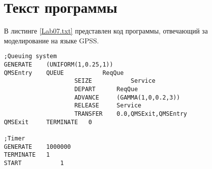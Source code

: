 \chapter{Текст программы}
В листинге \ref{Lab07.txt} представлен код программы, отвечающий за моделирование на языке GPSS.

\begin{lstlisting}[caption = {Реализация модели}, label=Lab07.txt]
;Queuing system
GENERATE	(UNIFORM(1,0.25,1))
QMSEntry	QUEUE			ReqQue
					SEIZE			Service
					DEPART		ReqQue
					ADVANCE		(GAMMA(1,0,0.2,3))
					RELEASE		Service
					TRANSFER	0.0,QMSExit,QMSEntry
QMSExit		TERMINATE	0

;Timer
GENERATE	1000000
TERMINATE	1
START			1
\end{lstlisting}